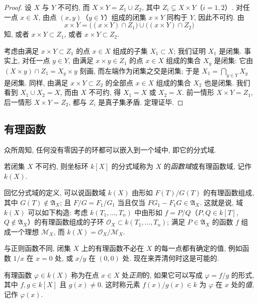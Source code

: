 \begin{proof}
	设 $X$ 与 $Y$ 不可约, 而 $X \times Y = Z_1 \cup Z_2$, 其中 $Z_i \subsetneq X \times Y$（$i = 1, 2$）. 对任一点 $x \in X$, 由点 $(x, y)$（$y \in Y$）组成的闭集 $x \times Y$ 同构于 $Y$, 因此不可约. 由
	\[
		x \times Y = \bigl( (x \times Y) \cap Z_1 \bigr) \cup \bigl( (x \times Y) \cap Z_2 \bigr)
	\]
	知, 或者 $x \times Y \subset Z_1$, 或者 $x \times Y \subset Z_2$.

	考虑由满足 $x \times Y \subset Z_1$ 的点 $x \in X$ 组成的子集 $X_1 \subset X$; 我们证明 $X_1$ 是闭集. 事实上, 对任一点 $y \in Y$, 由满足 $x \times y \in Z_1$ 的点 $x \in X$ 组成的集合 $X_y$ 是闭集: 它由 $(X \times y) \cap Z_1 = X_y \times y$ 刻画, 而左端作为闭集之交是闭集; 于是 $X_1 = \bigcap_{y \in Y} X_y$ 是闭集. 同样, 由满足 $x \times Y \subset Z_2$ 的全部点 $x \in X$ 组成的集合 $X_2$ 也是闭集. 我们看到 $X_1 \cup X_2 = X$, 而由 $X$ 不可约, 得 $X_1 = X$ 或 $X_2 = X$. 前一情形 $X \times Y = Z_1$, 后一情形 $X \times Y = Z_2$, 都与 $Z_i$ 是真子集矛盾. 定理证毕.
\end{proof}

\subsection{有理函数}

众所周知, 任何没有零因子的环都可以嵌入到一个域中, 即它的分式域.

\begin{definition}[函数域]\label{def:function-field-affine}
	若闭集 $X$ 不可约, 则坐标环 $k[X]$ 的分式域称为 $X$ 的\emph{函数域}或有理函数域, 记作 $k(X)$.
\end{definition}

回忆分式域的定义, 可以说函数域 $k(X)$ 由形如 $F(T)/G(T)$ 的有理函数组成, 其中 $G(T) \notin \mathfrak A_X$; 且 $F/G = F_1/G_1$ 当且仅当 $F G_1 - F_1 G \in \mathfrak A_X$. 这就是说, 域 $k(X)$ 可以如下构造: 考虑 $k(T_1, \ldots, T_n)$ 中由形如 $f = P/Q$（$P, Q \in k[T]$, $Q \notin \mathfrak A_X$）的有理函数组成的子环 $\mathcal O_X \subset k(T_1, \ldots, T_n)$; 满足 $P \in \mathfrak A_X$ 的函数 $f$ 组成一个理想 $\mathcal M_X$, 而 $k(X) = \mathcal O_X / \mathcal M_X$.

与正则函数不同, 闭集 $X$ 上的有理函数不必在 $X$ 的每一点都有确定的值, 例如函数 $1/x$ 在 $x = 0$ 处, 或 $x/y$ 在 $(0,0)$ 处. 现在来弄清何时这是可能的.

\begin{definition}[在一点正则与取值]\label{def:regular-value}
	有理函数 $\varphi \in k(X)$ 称为在点 $x \in X$ 处\emph{正则}的, 如果它可以写成 $\varphi = f/g$ 的形式, 其中 $f, g \in k[X]$ 且 $g(x) \ne 0$. 这时称元素 $f(x)/g(x) \in k$ 为 $\varphi$ 在 $x$ 处的\emph{值}, 记作 $\varphi(x)$.
\end{definition}

